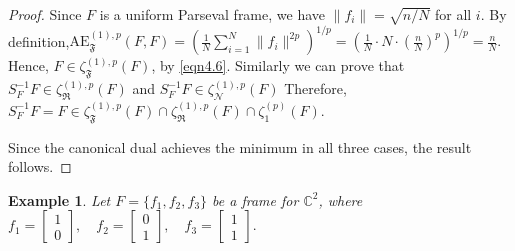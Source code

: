 \documentclass[final,1p,times]{elsarticle}
\newtheorem{example}[thm]{Example}
\begin{document}
\begin{proof}
Since \( F \) is a uniform Parseval frame, we have \( \|f_i\| = \sqrt{n/N} \) for all \( i \). By definition,$\mathrm{AE}_{\mathfrak{F}}^{(1),p}(F,F) = \left( \frac{1}{N} \sum_{i=1}^N \|f_i\|^{2p} \right)^{1/p} = \left( \frac{1}{N} \cdot N \cdot \left( \frac{n}{N} \right)^p \right)^{1/p} = \frac{n}{N}.$ Hence, \( F \in \zeta_{\mathfrak{F}}^{(1),p}(F) \), by \eqref{eqn4.6}. Similarly we can prove that $ S_F^{-1}F \in \zeta_{\mathfrak{R}}^{(1),p}(F)$ and $ S_F^{-1}F \in \zeta_{\mathcal{N}}^{(1),p}(F)$
Therefore, \( S_F^{-1}F = F \in \zeta_{\mathfrak{F}}^{(1),p}(F) \cap \zeta_{\mathfrak{R}}^{(1),p}(F) \cap \zeta_1^{(p)}(F) \).

\noindent Since the canonical dual achieves the minimum in all three cases, the result follows.
\end{proof}
	
		
\begin{example}
Let $F = \{f_1, f_2, f_3\}$ be a frame for $\mathbb{C}^2$, where
\(
f_1 = \begin{bmatrix} 1 \\ 0 \end{bmatrix}, \quad
f_2 = \begin{bmatrix} 0 \\ 1 \end{bmatrix}, \quad
f_3 = \begin{bmatrix} 1 \\ 1 \end{bmatrix}.
\)
\end{example}
\end{document}
